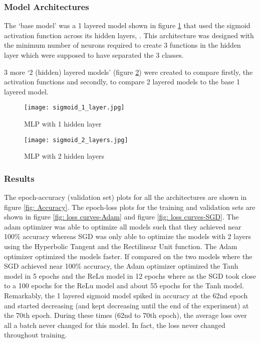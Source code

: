 \subsubsection{Model Architectures}
The `base model' was a 1 layered model shown in figure \ref{fig: NN 1l} that 
used the sigmoid activation function across its hidden layers, . This architecture was 
designed with the minimum number of neurons required to create 3 functions in the
hidden layer which were supposed to have separated the 3 classes.

3 more `2 (hidden) layered models' (figure \ref{fig: NN 2l}) were created to compare firstly, the activation
functions and secondly, to compare 2 layered models to the base 1 layered model.


\begin{figure}
    \centering
    \texttt{[image: sigmoid\_1\_layer.jpg]}
    \caption{MLP with 1 hidden layer}
    \label{fig: NN 1l}
\end{figure}

\begin{figure}
    \centering
    \texttt{[image: sigmoid\_2\_layers.jpg]}
    \caption{MLP with 2 hidden layers}
    \label{fig: NN 2l}
\end{figure}


\subsubsection{Results}

The epoch-accuracy (validation set) plots for all the architectures are shown in figure 
\ref{fig: Accuracy}. The epoch-loss plots for the training and validation sets are shown in figure \ref*{fig: loss curves-Adam}
and figure \ref{fig: loss curves-SGD}. The adam optimizer was able to optimize
all models such that they achieved near 100\% accuracy whereas SGD was only able
to optimize the models with 2 layers using the Hyperbolic Tangent and the Rectilinear
Unit function. The Adam optimizer optimized the models faster. If compared on the 
two models where the SGD achieved near 100\% accuracy, the Adam optimizer optimized 
the Tanh model in 5 epochs and the ReLu model in 12 epochs where as the SGD took 
close to a 100 epochs for the ReLu model and about 55 epochs for the Tanh model.
Remarkably, the 1 layered sigmoid model spiked in accuracy at the 62nd epoch and 
started decreasing (and kept decreasing until the end of the experiment) at the 
70th epoch. During these times (62nd to 70th epoch), the average loss over all a batch never changed
for this model. In fact, the loss never changed throughout training. 


